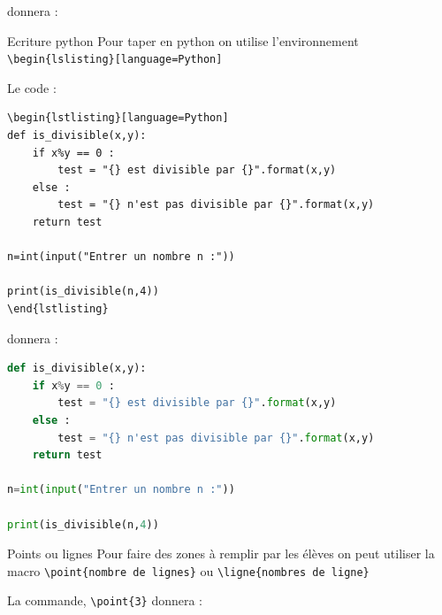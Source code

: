 \begin{pageCours}
\begin{Ex}
donnera :

\end{Ex}

\begin{DefT}{Ecriture python}
Pour taper en python on utilise l'environnement \verb|\begin{lslisting}[language=Python]|
\end{DefT}

\begin{Ex}
Le code : 
\begin{verbatim}
\begin{lstlisting}[language=Python] 
def is_divisible(x,y):
    if x%y == 0 :
    	test = "{} est divisible par {}".format(x,y) 
    else :	
        test = "{} n'est pas divisible par {}".format(x,y)
    return test    
    
n=int(input("Entrer un nombre n :"))
    
print(is_divisible(n,4))
\end{lstlisting}
\end{verbatim}

donnera : 

\begin{lstlisting}[language=Python] 
def is_divisible(x,y):
    if x%y == 0 :
    	test = "{} est divisible par {}".format(x,y) 
    else :	
        test = "{} n'est pas divisible par {}".format(x,y)
    return test    
    
n=int(input("Entrer un nombre n :"))
    
print(is_divisible(n,4))
\end{lstlisting}
\end{Ex}

\begin{DefT}{Points ou lignes}
Pour faire des zones à remplir par les élèves on peut utiliser la macro \verb|\point{nombre de lignes}| ou \verb|\ligne{nombres de ligne}|
\end{DefT}

\begin{Ex}
La commande, \verb|\point{3}| donnera :


\end{Ex}
\end{pageCours}
